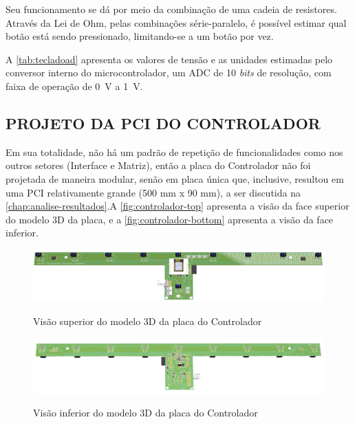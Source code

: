 Seu funcionamento se dá por meio da combinação de uma cadeia de resistores. Através da Lei de Ohm, pelas combinações série-paralelo, é possível estimar qual botão está sendo pressionado, limitando-se a um botão por vez.

A \autoref{tab:tecladoad} apresenta os valores de tensão e as unidades estimadas pelo conversor interno do microcontrolador, um ADC de 10 \emph{bits} de resolução, com faixa de operação de {0\ V} a {1\ V}.



\subsection{PROJETO DA PCI DO CONTROLADOR}
\label{subsec:pcicontrol}

Em sua totalidade, não há um padrão de repetição de funcionalidades como nos outros setores (Interface e Matriz), então a placa do Controlador não foi projetada de maneira modular, senão em placa única que, inclusive, resultou em uma PCI relativamente grande (500 mm x 90 mm), a ser discutida na \autoref{chap:analise-resultados}.A \autoref{fig:controlador-top} apresenta a visão da face superior do modelo 3D da placa, e a \autoref{fig:controlador-bottom} apresenta a visão da face inferior.

\begin{figure}[H]
    \centering
    \caption{Visão superior do modelo 3D da placa do Controlador}
    \includegraphics[width=1.0\textwidth]{./dados/figuras/controlador-top}
    \label{fig:controlador-top}
\end{figure}

\begin{figure}[H]
    \centering
    \caption{Visão inferior do modelo 3D da placa do Controlador}
    \includegraphics[width=1.0\textwidth]{./dados/figuras/controlador-bottom}
    \label{fig:controlador-bottom}
\end{figure}

